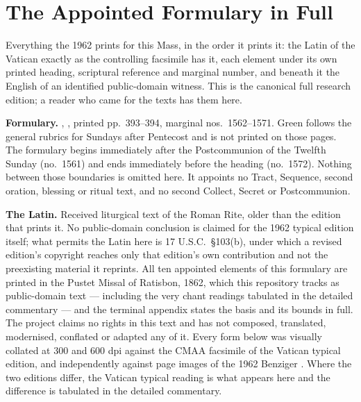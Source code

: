 \section*{The Appointed Formulary in Full}

Everything the 1962  prints for this Mass, in the order
it prints it: the Latin of the Vatican  exactly as the
controlling facsimile has it, each element under its own printed heading,
scriptural reference and marginal number, and beneath it the English of an
identified public-domain witness. This is the canonical full research edition;
a reader who came for the texts has them here.

\textbf{Formulary.} ,
, printed pp.~393--394, marginal nos.\ 1562--1571. Green
follows the general rubrics for Sundays after Pentecost and is not printed on
those pages. The formulary begins immediately after the Postcommunion of the
Twelfth Sunday (no.\ 1561) and ends immediately before the heading
 (no.\ 1572). Nothing between
those boundaries is omitted here. It appoints no Tract, Sequence, second
oration, blessing or ritual text, and no second Collect, Secret or
Postcommunion.

\textbf{The Latin.} Received liturgical text of the Roman Rite, older than the
edition that prints it. No public-domain conclusion is claimed for the 1962
typical edition itself; what permits the Latin here is 17 U.S.C.\ \S103(b),
under which a revised edition's copyright reaches only that edition's own
contribution and not the preexisting material it reprints. All ten appointed
elements of this formulary are printed in the Pustet Missal of Ratisbon, 1862,
which this repository tracks as public-domain text --- including the very
chant readings tabulated in the detailed commentary --- and the terminal
appendix states the basis and its bounds in full. The project claims no rights
in this text and has not composed, translated, modernised, conflated or
adapted any of it. Every form below was visually collated at 300 and 600 dpi
against the CMAA facsimile of the Vatican typical edition, and independently
against page images of the 1962 Benziger . Where
the two editions differ, the Vatican typical reading is what appears here and
the difference is tabulated in the detailed commentary.

